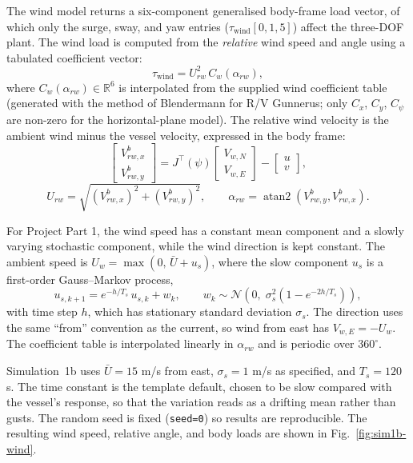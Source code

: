 \documentclass[10pt,conference]{IEEEtran}
\begin{document}
The wind model returns a six-component generalised body-frame load
vector, of which only the surge, sway, and yaw entries
($\tau_{\mathrm{wind}}[0,1,5]$) affect the three-DOF plant. The wind
load is computed from the \emph{relative} wind speed and angle using a
tabulated coefficient vector:
\begin{equation}
\tau_{\mathrm{wind}} = U_{rw}^2\, C_w(\alpha_{rw}),
\label{eq:wind}
\end{equation}
where $C_w(\alpha_{rw}) \in \mathbb{R}^6$ is interpolated from the
supplied wind coefficient table (generated with the method of
Blendermann \cite{blendermann1994} for R/V Gunnerus; only $C_x$,
$C_y$, $C_\psi$ are non-zero for the horizontal-plane model). The
relative wind velocity is the ambient wind minus the vessel velocity,
expressed in the body frame:
\begin{equation}
\begin{bmatrix} V_{rw,x}^b \\ V_{rw,y}^b \end{bmatrix}
= J^\top(\psi) \begin{bmatrix} V_{w,N} \\ V_{w,E} \end{bmatrix}
- \begin{bmatrix} u \\ v \end{bmatrix},
\end{equation}
\begin{equation}
U_{rw} = \sqrt{(V_{rw,x}^b)^2 + (V_{rw,y}^b)^2}, \qquad
\alpha_{rw} = \operatorname{atan2}(V_{rw,y}^b, V_{rw,x}^b).
\end{equation}

For Project Part 1, the wind speed has a constant mean component and
a slowly varying stochastic component, while the wind direction is
kept constant. The ambient speed is $U_w=\max(0,\,\bar U+u_s)$, where
the slow component $u_s$ is a first-order Gauss--Markov process,
\begin{equation}
u_{s,k+1} = e^{-h/T_s}\,u_{s,k} + w_k, \qquad
w_k\sim\mathcal{N}\!\left(0,\;\sigma_s^2\left(1-e^{-2h/T_s}\right)\right),
\end{equation}
with time step $h$, which has stationary standard deviation
$\sigma_s$. The direction uses the same ``from'' convention as the
current, so wind from east has $V_{w,E}=-U_w$. The coefficient table
is interpolated linearly in $\alpha_{rw}$ and is periodic over
$360^\circ$.

Simulation~1b uses $\bar U=15$ m/s from east, $\sigma_s=1$ m/s as
specified, and $T_s=120$ s. The time constant is the template
default, chosen to be slow compared with the vessel's response, so
that the variation reads as a drifting mean rather than gusts. The
random seed is fixed (\texttt{seed=0}) so results are reproducible.
The resulting wind speed, relative angle, and body loads are shown in
Fig.~\ref{fig:sim1b-wind}.
\end{document}
